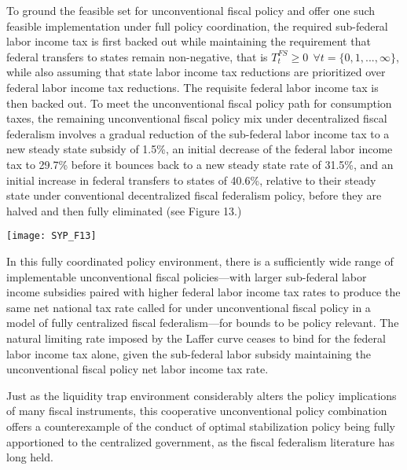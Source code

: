 \documentclass[12pt,letterpaper]{article}
\begin{document}
To ground the feasible set for unconventional fiscal policy and offer one such feasible implementation under full policy coordination, the required sub-federal labor income tax is first backed out while maintaining the requirement that federal transfers to states remain non-negative, that is $ T^{FS}_t \geq 0 \ \ \forall t=\{0,1,..., \infty\}$, while also assuming that state labor income tax reductions are prioritized over federal labor income tax reductions. The requisite federal labor income tax is then backed out. To meet the unconventional fiscal policy path for consumption taxes, the remaining unconventional fiscal policy mix under decentralized fiscal federalism involves a gradual reduction of the sub-federal labor income tax to a new steady state subsidy of 1.5\%, an initial decrease of the federal labor income tax to 29.7\% before it bounces back to a new steady state rate of 31.5\%, and an initial increase in federal transfers to states of 40.6\%, relative to their steady state under conventional decentralized fiscal federalism policy, before they are halved and then fully eliminated (see Figure 13.)

\begin{center}
\texttt{[image: SYP\_F13]}
\end{center}

In this fully coordinated policy environment, there is a sufficiently wide range of implementable unconventional fiscal policies---with larger sub-federal labor income subsidies  paired with higher federal labor income tax rates to produce the same net national tax rate called for under unconventional fiscal policy in a model of fully centralized fiscal federalism---for bounds to be policy relevant. The natural limiting rate imposed by the Laffer curve ceases to bind for the federal labor income tax alone, given the sub-federal labor subsidy maintaining the unconventional fiscal policy net labor income tax rate.


Just as the liquidity trap environment considerably alters the policy implications of many fiscal instruments, this cooperative unconventional policy combination offers a counterexample of the conduct of optimal stabilization policy being fully apportioned to the centralized government, as the fiscal federalism literature has long held. 
\end{document}
